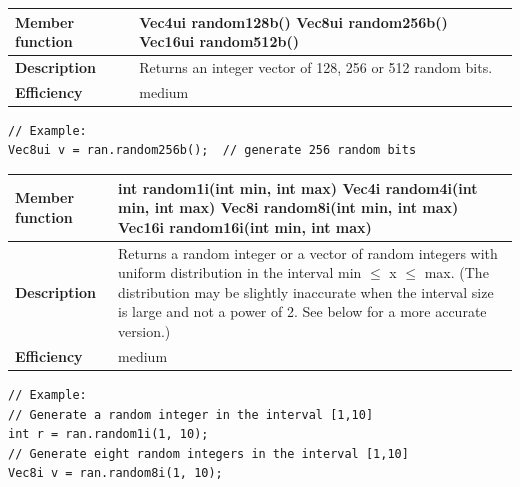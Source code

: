 \documentclass[11pt,a4paper,oneside,openright]{report}
\newcommand{\vspacesmall}{\vspace{3mm}}
\begin{document}
\begin{tabular}{|p{30mm}|p{100mm}|}
\hline
\bfseries Member function & Vec4ui random128b() \newline
Vec8ui random256b() \newline
Vec16ui random512b() \\ \hline
\bfseries Description & Returns an integer vector of 128, 256 or 512 random bits.  \\ \hline
\bfseries Efficiency & medium \\ \hline
\end{tabular}
\begin{lstlisting}[frame=none]
// Example:
Vec8ui v = ran.random256b();  // generate 256 random bits
\end{lstlisting}
\vspacesmall

\begin{tabular}{|p{30mm}|p{100mm}|}
\hline
\bfseries Member function & int random1i(int min, int max) \newline
Vec4i random4i(int min, int max) \newline
Vec8i random8i(int min, int max) \newline
Vec16i random16i(int min, int max) \\ \hline
\bfseries Description & Returns a random integer or a vector of random integers
with uniform distribution in the interval min $\leq$ x $\leq$ max. \newline
(The distribution may be slightly inaccurate when the interval size is large and not a power of 2. See below for a more accurate version.) \\ \hline
\bfseries Efficiency & medium \\ \hline
\end{tabular}
\begin{lstlisting}[frame=none]
// Example:
// Generate a random integer in the interval [1,10]
int r = ran.random1i(1, 10);
// Generate eight random integers in the interval [1,10]
Vec8i v = ran.random8i(1, 10);
\end{lstlisting}
\vspacesmall
\end{document}
